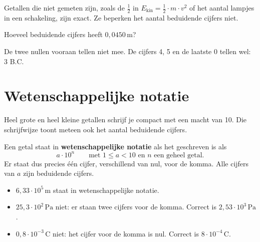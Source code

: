\documentclass{ximera}
\begin{document}
\begin{remark}[title={Exacte getallen}]\nl
    Getallen die niet gemeten zijn, zoals de $\frac{1}{2}$ in $E_{\text{kin}} = \frac{1}{2} \cdot m \cdot v^{2}$ of het aantal lampjes in een schakeling, zijn exact. Ze beperken het aantal beduidende cijfers niet.
\end{remark}

\begin{question}
    Hoeveel beduidende cijfers heeft $0{,}0450 \, \mathrm{m}$?

    \begin{multipleChoice}
    \end{multipleChoice}

    \begin{solution}\nl
        De twee nullen vooraan tellen niet mee. De cijfers 4, 5 en de laatste 0 tellen wel: 3 B.C.
    \end{solution}
\end{question}

\section{Wetenschappelijke notatie}\label{sec:wetenschappelijke_notatie}
Heel grote en heel kleine getallen schrijf je compact met een macht van 10. Die schrijfwijze toont meteen ook het aantal beduidende cijfers.

\begin{definition}[title={Wetenschappelijke notatie}]\nl
    Een getal staat in \textbf{wetenschappelijke notatie} als het geschreven is als
    \[ a \cdot 10^{n} \qquad \text{met } 1 \leq a < 10 \text{ en } n \text{ een geheel getal.} \]
    Er staat dus precies één cijfer, verschillend van nul, voor de komma. Alle cijfers van $a$ zijn beduidende cijfers.
\end{definition}

\begin{example}[title={Wel of niet in wetenschappelijke notatie?}]\nl
    \begin{itemize}
        \item $6{,}33 \cdot 10^{5} \, \mathrm{m}$ staat in wetenschappelijke notatie.
        \item $25{,}3 \cdot 10^{2} \, \mathrm{Pa}$ niet: er staan twee cijfers voor de komma. Correct is $2{,}53 \cdot 10^{3} \, \mathrm{Pa}$.
        \item $0{,}8 \cdot 10^{-3} \, \mathrm{C}$ niet: het cijfer voor de komma is nul. Correct is $8 \cdot 10^{-4} \, \mathrm{C}$.
    \end{itemize}
\end{example}
\end{document}
